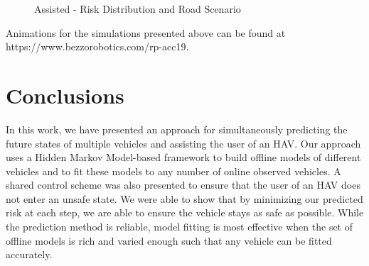 \documentclass[letterpaper, 10 pt, conference]{ieeeconf}  %
\newcommand\NB[1]{$\spadesuit$\footnote{NB: #1}}
\begin{document}
\begin{figure}[ht!]
	\centering
	\vspace{-5pt}
	\caption{Assisted - Risk Distribution and Road Scenario}
	\label{fig:assist}
	\vspace{-10pt}
\end{figure}
	\vspace{-0pt}

Animations for the simulations presented above can be found at https://www.bezzorobotics.com/rp-acc19.

\section{Conclusions} \label{sec:concs}
In this work, we have presented an approach for simultaneously predicting the future states of multiple vehicles and assisting the user of an HAV. Our approach uses a Hidden Markov Model-based framework to build offline models of different vehicles and to fit these models to any number of online observed vehicles. A shared control scheme was also presented to ensure that the user of an HAV does not enter an unsafe state. We were able to show that by minimizing our predicted risk at each step, we are able to ensure the vehicle stays as safe as possible. While the prediction method is reliable, model fitting is most effective when the set of offline models is rich and varied enough such that any vehicle can be fitted accurately.
\end{document}
